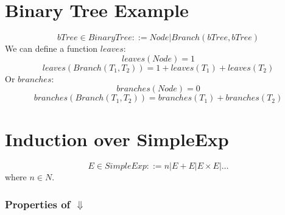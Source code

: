 \documentclass{report}
\begin{document}
    \section*{Binary Tree Example}
        \[bTree \in BinaryTree ::= Node | Branch(bTree, bTree)\]
        We can define a function $leaves$:
        \[leaves(Node) = 1\]
        \[leaves(Branch(T_1, T_2)) = 1 + leaves(T_1) + leaves(T_2)\]
        Or $branches$:
        \[branches(Node) = 0\]
        \[branches(Branch(T_1,T_2)) = branches(T_1) + branches(T_2)\]
    \section*{Induction over SimpleExp}
        \[E \in SimpleExp ::= n | E + E | E \times E | \dots\]
        where $n \in N$.
        \subsubsection*{Properties of $\Downarrow$}
            \begin{itemize}
            \end{itemize}






        
\end{document}
